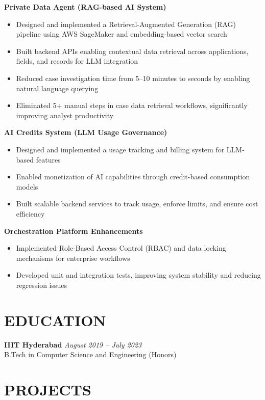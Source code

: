 \documentclass[letterpaper,11pt]{article}
\begin{document}
\textbf{Private Data Agent (RAG-based AI System)}
\begin{itemize}
    \item Designed and implemented a Retrieval-Augmented Generation (RAG) pipeline using AWS SageMaker and embedding-based vector search
    \item Built backend APIs enabling contextual data retrieval across applications, fields, and records for LLM integration
    \item Reduced case investigation time from 5--10 minutes to seconds by enabling natural language querying
    \item Eliminated 5+ manual steps in case data retrieval workflows, significantly improving analyst productivity
\end{itemize}

\textbf{AI Credits System (LLM Usage Governance)}
\begin{itemize}
    \item Designed and implemented a usage tracking and billing system for LLM-based features
    \item Enabled monetization of AI capabilities through credit-based consumption models
    \item Built scalable backend services to track usage, enforce limits, and ensure cost efficiency
\end{itemize}

\textbf{Orchestration Platform Enhancements}
\begin{itemize}
    \item Implemented Role-Based Access Control (RBAC) and data locking mechanisms for enterprise workflows
    \item Developed unit and integration tests, improving system stability and reducing regression issues
\end{itemize}

\vspace{-6pt}

\section*{EDUCATION}

\textbf{IIIT Hyderabad} \hfill \textit{August 2019 -- July 2023} \\
B.Tech in Computer Science and Engineering (Honors)

\vspace{-6pt}

\section*{PROJECTS}
\end{document}
